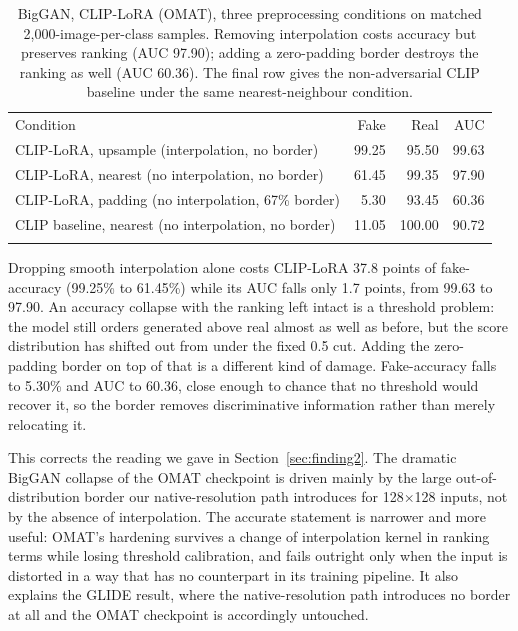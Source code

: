 \documentclass[3p,times,procedia]{elsarticle}
\begin{document}
\begin{table}[h]
\caption{BigGAN, CLIP-LoRA (OMAT), three preprocessing conditions on
matched 2{,}000-image-per-class samples. Removing interpolation costs
accuracy but preserves ranking (AUC 97.90); adding a zero-padding border
destroys the ranking as well (AUC 60.36). The final row gives the
non-adversarial CLIP baseline under the same nearest-neighbour condition.}
\label{tab:disentangle}
\begin{tabular*}{\hsize}{@{\extracolsep{\fill}}lrrr@{}}
\toprule
Condition & Fake & Real & AUC \\
\colrule
CLIP-LoRA, upsample (interpolation, no border) & 99.25 & 95.50 & 99.63 \\
CLIP-LoRA, nearest (no interpolation, no border) & 61.45 & 99.35 & 97.90 \\
CLIP-LoRA, padding (no interpolation, 67\% border) & 5.30 & 93.45 & 60.36 \\
CLIP baseline, nearest (no interpolation, no border) & 11.05 & 100.00 & 90.72 \\
\botrule
\end{tabular*}
\end{table}

Dropping smooth interpolation alone costs CLIP-LoRA 37.8 points of
fake-accuracy (99.25\% to 61.45\%) while its AUC falls only 1.7 points, from
99.63 to 97.90. An accuracy collapse with the ranking left intact is a
threshold problem: the model still orders generated above real almost as
well as before, but the score distribution has shifted out from under the
fixed 0.5 cut. Adding the zero-padding border on top of that is a different
kind of damage. Fake-accuracy falls to 5.30\% and AUC to 60.36, close
enough to chance that no threshold would recover it, so the border removes
discriminative information rather than merely relocating it.

This corrects the reading we gave in Section~\ref{sec:finding2}. The
dramatic BigGAN collapse of the OMAT checkpoint is driven mainly by the
large out-of-distribution border our native-resolution path introduces for
128$\times$128 inputs, not by the absence of interpolation. The accurate
statement is narrower and more useful: OMAT's hardening survives a change
of interpolation kernel in ranking terms while losing threshold
calibration, and fails outright only when the input is distorted in a way
that has no counterpart in its training pipeline. It also explains the
GLIDE result, where the native-resolution path introduces no border at all
and the OMAT checkpoint is accordingly untouched.
\end{document}
